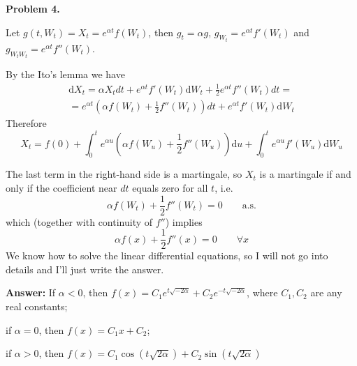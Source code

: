 \documentclass[12pt, a4paper]{article}
\newcommand{\dt}{dt}
\newcommand{\du}{\mathrm{d}u}
\begin{document}
\textbf{Problem 4.}\par
Let $g(t,W_{t}) = X_{t} = e^{\alpha t}f(W_{t})$, then $g_{t} = \alpha g$, $g_{W_{t}} = e^{\alpha t}f'(W_{t})$ and $g_{W_{t}W_{t}} = e^{\alpha t}f''(W_{t})$.\par
By the Ito's lemma we have
\begin{align*}
\mathrm{d}X_{t} = \alpha X_{t}\dt + e^{\alpha t}f'(W_{t})\mathrm{d}W_{t} + \frac{ 1}{ 2}e^{\alpha t}f''(W_{t})\dt =\\
= e^{\alpha t}\left(\alpha f(W_{t}) + \frac{ 1}{ 2}f''(W_{t})\right)\dt + e^{\alpha t}f'(W_{t})\mathrm{d}W_{t}
\end{align*}
Therefore
\[
X_{t} = f(0) + \int_0^{t}e^{\alpha u}\left(\alpha f(W_{u}) + \frac{ 1}{ 2}f''(W_{u})\right)\du + \int_0^{t}e^{\alpha u}f'(W_{u})\mathrm{d}W_{u}
\]
\par
The last term in the right-hand side is a martingale, so $X_{t}$ is a martingale if and only if the coefficient near $\dt$ equals zero for all $t$, i.e.
\[
\alpha f(W_{t}) + \frac{ 1}{ 2}f''(W_{t}) = 0 \qquad \text{a.s.}
\]
which (together with continuity of $f''$) implies
\[
\alpha f(x) + \frac{ 1}{ 2}f''(x) = 0\qquad \forall x
\]
We know how to solve the linear differential equations, so I will not go into details and I'll just write the answer.\[\]\par
\textbf{Answer:} If $\alpha < 0$, then $f(x) = C_{1}e^{t\sqrt{-2\alpha}} + C_{2}e^{-t\sqrt{-2\alpha}}$, where $C_{1}, C_{2}$ are any real constants;\par
if $\alpha = 0$, then $f(x) = C_{1}x + C_{2}$;\par
if $\alpha > 0$, then $f(x) = C_{1}\cos(t\sqrt{2\alpha}) + C_{2}\sin(t\sqrt{2\alpha})$
\end{document}

